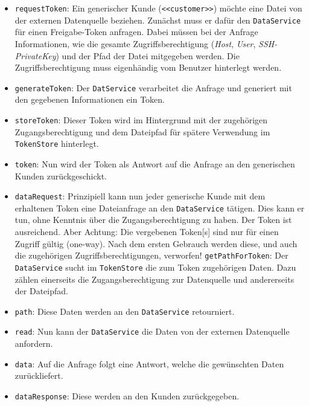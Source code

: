 \begin{itemize}
    \item \texttt{requestToken}: Ein generischer Kunde (\texttt{<<customer>>}) möchte eine Datei von der externen Datenquelle beziehen. Zunächst muss er dafür den \texttt{Da\-ta\-Ser\-vi\-ce} für einen Freigabe-\gls{Token} anfragen. Dabei müssen bei der Anfrage Informationen, wie die gesamte Zugriffsberechtigung (\textit{Host}, \textit{User}, \textit{SSH-PrivateKey}) und der Pfad der Datei mitgegeben werden. Die Zugriffsberechtigung muss eigenhändig vom Benutzer hinterlegt werden.
    
    \item \texttt{generateToken}: Der \texttt{DatService} verarbeitet die Anfrage und generiert mit den gegebenen Informationen ein \gls{Token}.
    
    \item \texttt{storeToken}: Dieser \gls{Token} wird im Hintergrund mit der zu\-ge\-höri\-gen Zugangsberechtigung und dem Dateipfad für spätere Verwendung im \texttt{TokenStore} hinterlegt.
    
    \item \texttt{token}: Nun wird der \gls{Token} als Antwort auf die Anfrage an den generischen Kunden zurückgeschickt.
    
    \item \texttt{dataRequest}: Prinzipiell kann nun jeder generische Kunde mit dem erhaltenen \gls{Token} eine Dateianfrage an den \texttt{DataService} tätigen. Dies kann er tun, ohne Kenntnis über die Zugangsberechtigung zu haben. Der \gls{Token} ist ausreichend. Aber Achtung: Die vergebenen \gls{Token}[s] sind nur für einen Zugriff gültig (one-way). Nach dem ersten Gebrauch werden diese, und auch die zugehörigen Zugriffsberechtigungen, verworfen!
    \texttt{getPathForToken}: Der \texttt{DataService} sucht im \texttt{TokenStore} die zum \gls{Token} zu\-ge\-hör\-igen Daten. Dazu zählen einerseits die Zugangsberechtigung zur Datenquelle und andererseits der Dateipfad.
    
    \item \texttt{path}: Diese Daten werden an den \texttt{DataService} retourniert.
    \item \texttt{read}: Nun kann der \texttt{DataService} die Daten von der externen Datenquelle anfordern.
    \item \texttt{data}: Auf die Anfrage folgt eine Antwort, welche die ge\-wünsch\-ten Daten zurückliefert.
    \item \texttt{dataResponse}: Diese werden an den Kunden zurückgegeben.

\end{itemize}


